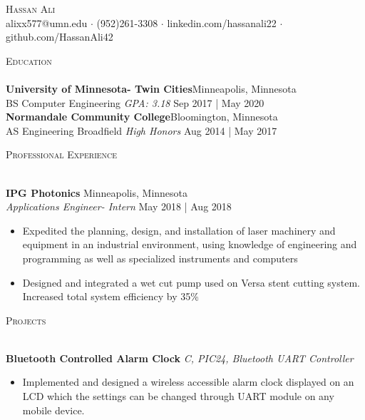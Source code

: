 \documentclass[a4paper]{article}
\newcommand{\lineunder} {
	\vspace*{-8pt} \\
	\hspace*{-18pt} \hrulefill \\
}
\newcommand{\header} [1] {
	{\hspace*{-18pt}\vspace*{6pt} \textsc{#1}}
	\vspace*{-6pt} \lineunder
}
\begin{document}
	\vspace*{-40pt}
	
	
	
	\vspace*{-10pt}
	\begin{center}
		{\fontsize{40}{48} \scshape \selectfont Hassan Ali}\\
		\vspace{3mm}
		{\large {alixx577@umn.edu $\cdot$ (952)261-3308 $\cdot$ linkedin.com/hassanali22 $\cdot$ github.com/HassanAli42}}\\
	\end{center}
	
	\header {\large \scshape{Education}}
	\vspace{1mm}
	\textbf{University of Minnesota- Twin Cities}\hfill Minneapolis, Minnesota\\
	BS Computer Engineering \textit{GPA: 3.18} \hfill Sep 2017 | May 2020\\
	\vspace{2mm}
	\textbf{Normandale Community College}\hfill Bloomington, Minnesota\\
	AS Engineering Broadfield \textit{High Honors} \hfill Aug 2014 | May 2017\\
	\vspace{2mm}
	
	\header{\large \scshape {Professional Experience}}
	\vspace{1mm}
	
	\textbf{IPG Photonics} \hfill Minneapolis, Minnesota\\
	\textit{Applications Engineer- Intern} \hfill May 2018 | Aug 2018\\
	\vspace{-1mm}
	\begin{itemize} \itemsep 1pt
		\item Expedited the planning, design, and installation of laser machinery and equipment in an industrial environment, using knowledge of engineering and programming as well as specialized instruments and computers
		\item Designed and integrated a wet cut pump used on Versa stent cutting system. Increased total system efficiency by 35\%
	\end{itemize}

	\header{\large \scshape {Projects}}
	\vspace{1mm}
	
	{\textbf{Bluetooth Controlled Alarm Clock}} {\sl C, PIC24, Bluetooth UART Controller} \\
	\vspace*{-1mm}
	\begin{itemize} \itemsep 1pt
		\item Implemented and designed a wireless accessible alarm clock displayed on an LCD which the settings can be changed through UART module on any mobile device.
	\end{itemize}
	\vspace*{-1mm}
	
\end{document}
